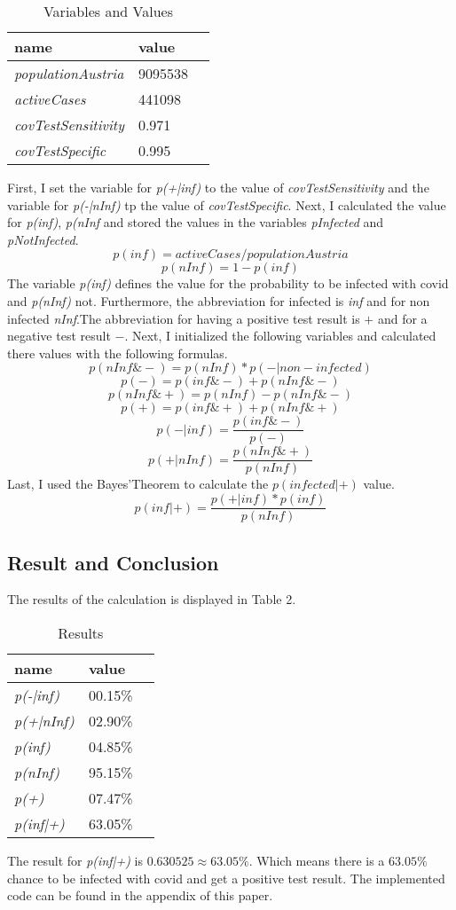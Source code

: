 \documentclass[10pt, a4paper, twocolumn]{article} %
\begin{document}
\begin{table}[htbp]
    \label{tab:alphaBetaParameters}
	\caption{Variables and Values}
	\centering
	\begin{tabular}{llr}
		\cmidrule(r){1-2}
		name & value \\
		\midrule
		\textit{populationAustria} & 9095538 \\
		\textit{activeCases} & 441098 \\
		\textit{covTestSensitivity} & 0.971 \\
		\textit{covTestSpecific} & 0.995 \\
		\bottomrule
	\end{tabular}
\end{table}
First, I set the variable for \textit{p(+|inf)} to the value of \textit{covTestSensitivity} and the variable for \textit{p(-|nInf)} tp the value of \textit{covTestSpecific}.
Next, I calculated the value for \textit{p(inf)}, \textit{p(nInf} and stored the values in the variables 
\textit{pInfected} and \textit{pNotInfected}. 
\[
p(inf) = \textit{activeCases} / \textit{populationAustria}
\]
\[
p(nInf) = 1 -  p(inf)
\]
The variable \textit{p(inf)} defines the value for the probability to be infected with covid and \textit{p(nInf)} not. 
Furthermore, the abbreviation for infected is \textit{inf} and for non infected \textit{nInf}.The abbreviation for having a positive test result is $+$ and for a negative test result $-$.
Next, I initialized the following variables and calculated there values with the following formulas.
\[
p(nInf \& -) = p(nInf) * p(-|non-infected)
\]
\[
p(-) = p(inf \& -) + p(nInf \& -)
\]
\[
p(nInf \& +) = p(nInf) - p(nInf\& -)
\]
\[
p(+) = p(inf \& +) + p(nInf \& +)
\]
\[
p(-|inf) = \frac{p(inf \& -)}{p(-)}
\]
\[
p(+|nInf) = \frac{p(nInf\& +)}{p(nInf)}
\]
Last, I used the Bayes'Theorem to calculate the $p(infected|+)$ value.
\[
p(inf|+) = \frac{p(+|inf) * p(inf)} {p(nInf)}
\]


\subsection{Result and Conclusion}
The results of the calculation is displayed in Table 2.
\begin{table}[htbp]
    \label{tab:alphaBetaParameters}
	\caption{Results}
	\centering
	\begin{tabular}{llr}
		\cmidrule(r){1-2}
		name & value \\
		\midrule
		\textit{p(-|inf)}  & 00.15\% \\
		\textit{p(+|nInf)} & 02.90\% \\
		\textit{p(inf)}    & 04.85\% \\
		\textit{p(nInf)}   & 95.15\% \\
		\textit{p(+)}      & 07.47\% \\
		\textit{p(inf|+)}  & 63.05\% \\
		\bottomrule
	\end{tabular}
\end{table}
The result for \textit{p(inf|+)} is $0.630525 \approx 63.05\%$. Which means there is a $63.05\%$ chance to be infected with covid and get a positive test result. The implemented code can be found in the appendix of this paper.
\end{document}
